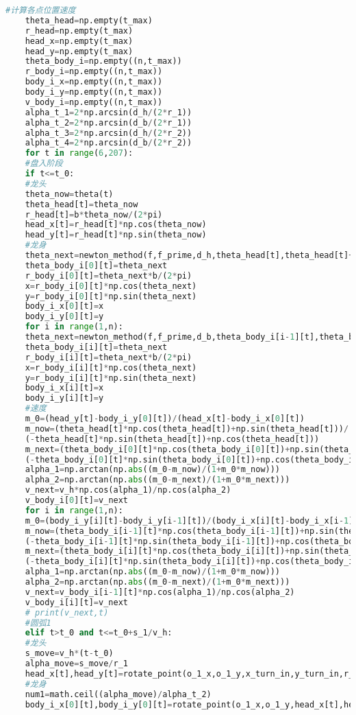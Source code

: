 \documentclass[withoutpreface,bwprint]{cumcmthesis} %
\begin{document}
\begin{lstlisting}[language=Python]
	#计算各点位置速度
	theta_head=np.empty(t_max)
	r_head=np.empty(t_max)
	head_x=np.empty(t_max)
	head_y=np.empty(t_max)
	theta_body_i=np.empty((n,t_max))
	r_body_i=np.empty((n,t_max))
	body_i_x=np.empty((n,t_max))
	body_i_y=np.empty((n,t_max))
	v_body_i=np.empty((n,t_max))
	alpha_t_1=2*np.arcsin(d_h/(2*r_1))
	alpha_t_2=2*np.arcsin(d_b/(2*r_1))
	alpha_t_3=2*np.arcsin(d_h/(2*r_2))
	alpha_t_4=2*np.arcsin(d_b/(2*r_2))
	for t in range(6,207):
	#盘入阶段
	if t<=t_0:
	#龙头
	theta_now=theta(t)
	theta_head[t]=theta_now
	r_head[t]=b*theta_now/(2*pi)
	head_x[t]=r_head[t]*np.cos(theta_now)
	head_y[t]=r_head[t]*np.sin(theta_now)
	#龙身
	theta_next=newton_method(f,f_prime,d_h,theta_head[t],theta_head[t]+pi/2)
	theta_body_i[0][t]=theta_next
	r_body_i[0][t]=theta_next*b/(2*pi)
	x=r_body_i[0][t]*np.cos(theta_next)
	y=r_body_i[0][t]*np.sin(theta_next)
	body_i_x[0][t]=x
	body_i_y[0][t]=y
	for i in range(1,n):
	theta_next=newton_method(f,f_prime,d_b,theta_body_i[i-1][t],theta_body_i[i-1][t]+pi/2)
	theta_body_i[i][t]=theta_next
	r_body_i[i][t]=theta_next*b/(2*pi)
	x=r_body_i[i][t]*np.cos(theta_next)
	y=r_body_i[i][t]*np.sin(theta_next)
	body_i_x[i][t]=x
	body_i_y[i][t]=y
	#速度
	m_0=(head_y[t]-body_i_y[0][t])/(head_x[t]-body_i_x[0][t])
	m_now=(theta_head[t]*np.cos(theta_head[t])+np.sin(theta_head[t]))/
	(-theta_head[t]*np.sin(theta_head[t])+np.cos(theta_head[t]))
	m_next=(theta_body_i[0][t]*np.cos(theta_body_i[0][t])+np.sin(theta_body_i[0][t]))/
	(-theta_body_i[0][t]*np.sin(theta_body_i[0][t])+np.cos(theta_body_i[0][t]))
	alpha_1=np.arctan(np.abs((m_0-m_now)/(1+m_0*m_now)))
	alpha_2=np.arctan(np.abs((m_0-m_next)/(1+m_0*m_next)))
	v_next=v_h*np.cos(alpha_1)/np.cos(alpha_2)
	v_body_i[0][t]=v_next
	for i in range(1,n):
	m_0=(body_i_y[i][t]-body_i_y[i-1][t])/(body_i_x[i][t]-body_i_x[i-1][t])
	m_now=(theta_body_i[i-1][t]*np.cos(theta_body_i[i-1][t])+np.sin(theta_body_i[i-1][t]))/
	(-theta_body_i[i-1][t]*np.sin(theta_body_i[i-1][t])+np.cos(theta_body_i[i-1][t]))
	m_next=(theta_body_i[i][t]*np.cos(theta_body_i[i][t])+np.sin(theta_body_i[i][t]))/
	(-theta_body_i[i][t]*np.sin(theta_body_i[i][t])+np.cos(theta_body_i[i][t]))
	alpha_1=np.arctan(np.abs((m_0-m_now)/(1+m_0*m_now)))
	alpha_2=np.arctan(np.abs((m_0-m_next)/(1+m_0*m_next)))
	v_next=v_body_i[i-1][t]*np.cos(alpha_1)/np.cos(alpha_2)
	v_body_i[i][t]=v_next
	# print(v_next,t)
	#圆弧1
	elif t>t_0 and t<=t_0+s_1/v_h:
	#龙头
	s_move=v_h*(t-t_0)
	alpha_move=s_move/r_1
	head_x[t],head_y[t]=rotate_point(o_1_x,o_1_y,x_turn_in,y_turn_in,r_1,-alpha_move)
	#龙身
	num1=math.ceil((alpha_move)/alpha_t_2)
	body_i_x[0][t],body_i_y[0][t]=rotate_point(o_1_x,o_1_y,head_x[t],head_y[t],r_1,alpha_t_1)

\end{lstlisting}
\end{document}
